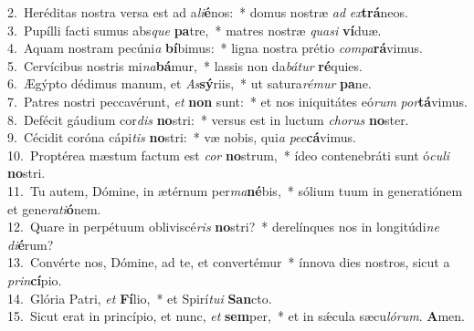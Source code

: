 {2.~}Heréditas nostra versa est ad a\textit{li}\textbf{é}nos:~* domus nostræ \textit{ad} \textit{ex}\textbf{trá}neos.\\
{3.~}Pupílli facti sumus abs\textit{que} \textbf{pa}tre,~* matres nostræ \textit{qua}\textit{si} \textbf{ví}duæ.\\
{4.~}Aquam nostram pecúni\textit{a} \textbf{bí}bimus:~* ligna nostra prétio \textit{com}\textit{pa}\textbf{rá}vimus.\\
{5.~}Cervícibus nostris mi\textit{na}\textbf{bá}mur,~* lassis non da\textit{bá}\textit{tur} \textbf{ré}quies.\\
{6.~}Ægýpto dédimus manum, et \textit{As}\textbf{sý}riis,~* ut satura\textit{ré}\textit{mur} \textbf{pa}ne.\\
{7.~}Patres nostri peccavérunt, \textit{et} \textbf{non} sunt:~* et nos iniquitátes eó\textit{rum} \textit{por}\textbf{tá}vimus.\\
{8.~}Defécit gáudium cor\textit{dis} \textbf{no}stri:~* versus est in luctum \textit{cho}\textit{rus} \textbf{no}ster.\\
{9.~}Cécidit coróna cápi\textit{tis} \textbf{no}stri:~* væ nobis, qui\textit{a} \textit{pec}\textbf{cá}vimus.\\
{10.~}Proptérea mæstum factum est \textit{cor} \textbf{no}strum,~* ídeo contenebráti sunt ó\textit{cu}\textit{li} \textbf{no}stri.\\
{11.~}Tu autem, Dómine, in ætérnum per\textit{ma}\textbf{né}bis,~* sólium tuum in generatiónem et gene\textit{ra}\textit{ti}\textbf{ó}nem.\\
{12.~}Quare in perpétuum obliviscé\textit{ris} \textbf{no}stri?~* derelínques nos in longitúdi\textit{ne} \textit{di}\textbf{é}rum?\\
{13.~}Convérte nos, Dómine, ad te, et convertémur~* ínnova dies nostros, sicut a \textit{prin}\textbf{cí}pio.\\
{14.~}Glória Patri, \textit{et} \textbf{Fí}lio,~* et Spirí\textit{tu}\textit{i} \textbf{San}cto.\\
{15.~}Sicut erat in princípio, et nunc, \textit{et} \textbf{sem}per,~* et in sǽcula sæcu\textit{ló}\textit{rum}. \textbf{A}men.\\
